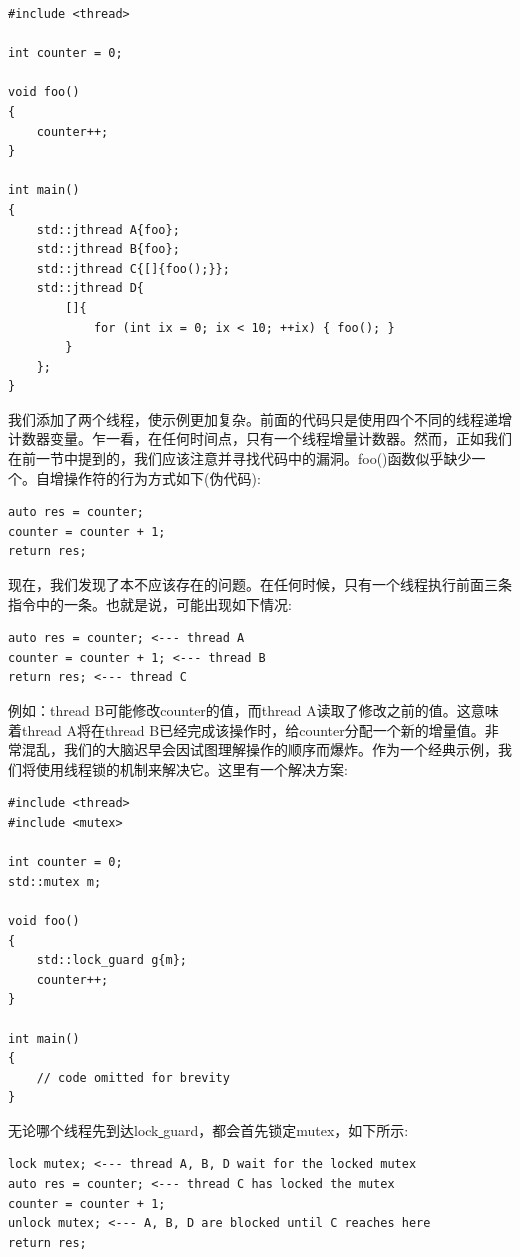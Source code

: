 \begin{lstlisting}[caption={}]
#include <thread>

int counter = 0;

void foo()
{
	counter++;
}

int main()
{
	std::jthread A{foo};
	std::jthread B{foo};
	std::jthread C{[]{foo();}};
	std::jthread D{
		[]{
			for (int ix = 0; ix < 10; ++ix) { foo(); }
		}
	};
}
\end{lstlisting}

我们添加了两个线程，使示例更加复杂。前面的代码只是使用四个不同的线程递增计数器变量。乍一看，在任何时间点，只有一个线程增量计数器。然而，正如我们在前一节中提到的，我们应该注意并寻找代码中的漏洞。foo()函数似乎缺少一个。自增操作符的行为方式如下(伪代码): \par

\begin{lstlisting}[caption={}]
auto res = counter;
counter = counter + 1;
return res;
\end{lstlisting}

现在，我们发现了本不应该存在的问题。在任何时候，只有一个线程执行前面三条指令中的一条。也就是说，可能出现如下情况: \par

\begin{lstlisting}[caption={}]
auto res = counter; <--- thread A
counter = counter + 1; <--- thread B
return res; <--- thread C
\end{lstlisting}

例如：thread B可能修改counter的值，而thread A读取了修改之前的值。这意味着thread A将在thread B已经完成该操作时，给counter分配一个新的增量值。非常混乱，我们的大脑迟早会因试图理解操作的顺序而爆炸。作为一个经典示例，我们将使用线程锁的机制来解决它。这里有一个解决方案: \par

\begin{lstlisting}[caption={}]
#include <thread>
#include <mutex>

int counter = 0;
std::mutex m;

void foo()
{
	std::lock_guard g{m};
	counter++;
}

int main()
{
	// code omitted for brevity
}
\end{lstlisting}

无论哪个线程先到达lock\underline{ }guard，都会首先锁定mutex，如下所示: \par

\begin{lstlisting}[caption={}]
lock mutex; <--- thread A, B, D wait for the locked mutex
auto res = counter; <--- thread C has locked the mutex
counter = counter + 1;
unlock mutex; <--- A, B, D are blocked until C reaches here
return res;
\end{lstlisting}

